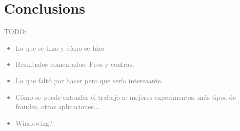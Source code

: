 \newpage
\section{Conclusions}

\textcolor{gray}{TODO: 
\begin{itemize}
    \item Lo que se hizo y cómo se hizo
    \item Resultados comentados. Pros y contras.
    \item Lo que faltó por hacer pero que sería interesante.
    \item Cómo se puede extender el trabajo a: mejores experimentos, más tipos de fraudes, otras aplicaciones...
    \item Windowing?
\end{itemize}
}